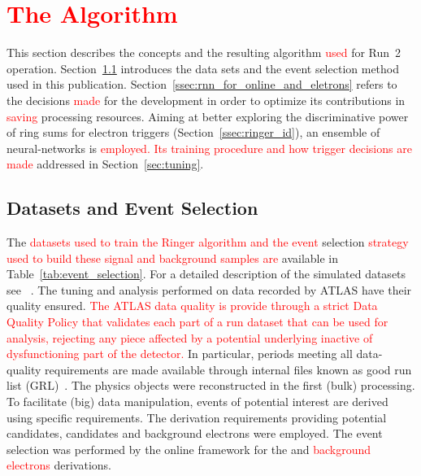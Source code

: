 \chapter{\textcolor{red}{The \rnn{} Algorithm}}%
\label{sec:neuralringer}

This section describes the \rnn{} concepts and the resulting algorithm \textcolor{red}{used} for Run~2
operation. Section~\ref{ssec:dataset} introduces the data sets and the event selection method used in this publication. Section~\ref{ssec:rnn_for_online_and_eletrons} refers to the
decisions \textcolor{red}{made} for the \rnn{} development in order to optimize its contributions in \textcolor{red}{saving} processing resources. Aiming at better exploring the discriminative
power of ring sums for electron triggers (Section~\ref{ssec:ringer_id}),
an ensemble of neural-networks is \textcolor{red}{employed.  Its training procedure and how trigger decisions are made} addressed in Section~\ref{sec:tuning}.




\section{Datasets and Event Selection}%
\label{ssec:dataset}

The \textcolor{red}{datasets used to train the Ringer algorithm and the event} selection \textcolor{red}{strategy used to build these signal and background samples are} available in
Table~\ref{tab:event_selection}. For a detailed description of the simulated
datasets see ~\cite[Section 3]{ATLAS-PERF-2017-01-002}. The tuning and analysis
performed on data recorded by ATLAS have their quality ensured. \textcolor{red}{The ATLAS data quality is provide through a strict Data Quality Policy that validates each part of a run dataset that can be used for analysis, rejecting any piece affected by a potential underlying inactive of dysfunctioning part of the detector.} 
In particular, periods meeting all data-quality requirements
are made available through internal files known as good run list
(GRL)~\cite{grl_site}. The physics objects were reconstructed in the first
(bulk) processing. To facilitate (big) data manipulation, events of potential
interest are derived using specific requirements. The derivation requirements
providing potential \Zee{} \tnp{} candidates, %
\Jee{} \tnp{} candidates
 and background electrons %
  were employed. The event selection was
performed by the online framework for the \textcolor{red}{\Zee{} \tnp{}} and \textcolor{red}{background electrons} derivations.%

